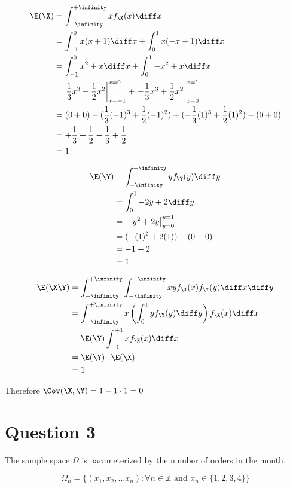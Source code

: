 \begin{align*}
\E(\X) &= \int _{-\infinity} ^{+\infinity} x f_\X(x) \diff x \\
&= \int _{-1} ^0 x(x+1)\diff x + \int _0 ^1 x(-x + 1) \diff x \\
&= \int _{-1} ^0 x^2+x \diff x + \int _0 ^{1} -x^2 + x \diff x \\
&= \left. \frac{1}{3}x^3 + \frac{1}{2}x^2 \right|^{x=0}_{x=-1} +
\left. -\frac{1}{3}x^3 + \frac{1}{2}x^2 \right|^{x=1}_{x=0} \\
&= (0 + 0) - (\frac{1}{3}(-1)^3 + \frac{1}{2}(-1)^2) +
(-\frac{1}{3}(1)^3 + \frac{1}{2}(1)^2) - (0 + 0) \\
&= +\frac{1}{3} + \frac{1}{2} - \frac{1}{3} + \frac{1}{2} \\
&= 1
\end{align*}

\begin{align*}
\E(\Y) &= \int_{-\infinity}^{+\infinity} yf_\Y(y) \diff y\\
&= \int _0 ^1 -2y + 2 \diff y \\
&= \left. -y^2 + 2y \right|^{y=1}_{y=0} \\
&= (-(1)^2 + 2(1)) - (0 + 0) \\
&= -1 + 2 \\
&= 1
\end{align*}


\begin{align*}
\E(\X\Y) &= \int _{-\infinity} ^{+\infinity} \int _{-\infinity} ^{+\infinity} xy f_\X(x)f_\Y(y) \diff x \diff y \\
&= \int _{-\infinity} ^{+\infinity} x\left(\int _0 ^1 y f_\Y(y)\diff y\right)f_\X(x) \diff x \\
&= \E(\Y) \int _{-1} ^{+1} x f_\X(x) \diff x \\
&= \E(\Y) \cdot \E(\X) \\
&= 1
\end{align*}

Therefore $\Cov(\X, \Y) = 1 - 1 \cdot 1 = 0$

\newpage
\section{Question 3}

The sample space $\Omega$ is parameterized by the number of orders in the month.

\[
\Omega_n = \{ (x_1, x_2, \ldots x_n) : \forall n\in \mathbb{Z} \text{ and } x_n \in \{ 1, 2, 3, 4 \} \}
\]

